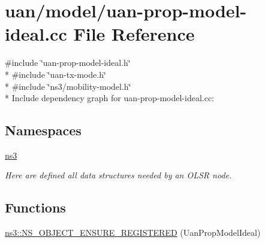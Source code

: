 \hypertarget{uan-prop-model-ideal_8cc}{}\section{uan/model/uan-\/prop-\/model-\/ideal.cc File Reference}
\label{uan-prop-model-ideal_8cc}
{\ttfamily \#include \char`\"{}uan-\/prop-\/model-\/ideal.\+h\char`\"{}}\\*
{\ttfamily \#include \char`\"{}uan-\/tx-\/mode.\+h\char`\"{}}\\*
{\ttfamily \#include \char`\"{}ns3/mobility-\/model.\+h\char`\"{}}\\*
Include dependency graph for uan-\/prop-\/model-\/ideal.cc\+:
\subsection*{Namespaces}
\begin{DoxyCompactItemize}
\item 
 \hyperlink{namespacens3}{ns3}
\begin{DoxyCompactList}\small\item\em Here are defined all data structures needed by an O\+L\+SR node. \end{DoxyCompactList}\end{DoxyCompactItemize}
\subsection*{Functions}
\begin{DoxyCompactItemize}
\item 
\hyperlink{namespacens3_a98fabc8c0e775fe7130db109914a696c}{ns3\+::\+N\+S\+\_\+\+O\+B\+J\+E\+C\+T\+\_\+\+E\+N\+S\+U\+R\+E\+\_\+\+R\+E\+G\+I\+S\+T\+E\+R\+ED} (Uan\+Prop\+Model\+Ideal)
\end{DoxyCompactItemize}
